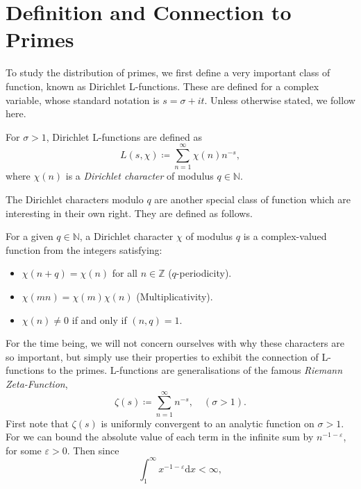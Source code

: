 \section{Definition and Connection to Primes}
To study the distribution of primes, we first define a very important class of function, known as Dirichlet L-functions. These are defined for a complex variable, whose standard notation is $s = \sigma + i t$. Unless otherwise stated, we follow \cite{ireland_rosen_1990} here.
\begin{definition}
\label{LFunctionDefinition}
For $\sigma > 1$, Dirichlet L-functions are defined as
\begin{equation}
    L(s, \chi) \coloneqq \sum_{n=1}^{\infty} \chi(n) n^{-s}, \nonumber
\end{equation}
where $\chi(n)$ is a \textit{Dirichlet character} of modulus $q \in \mathbb{N}$.
\end{definition}
The Dirichlet characters modulo $q$ are another special class of function which are interesting in their own right. They are defined as follows.
\begin{definition}
\label{DirichletCharacterDefinition}
For a given $q \in \mathbb{N}$, a Dirichlet character $\chi$ of modulus $q$ is a complex-valued function from the integers satisfying:
\begin{itemize}
    \item $\chi(n + q) = \chi(n)$ for all $n \in \mathbb{Z}$ ($q$-periodicity).
    \item $\chi(m n) = \chi(m) \chi(n)$ (Multiplicativity).
    \item $\chi(n) \neq 0$ if and only if $(n, q) = 1$.
\end{itemize}
\end{definition}
For the time being, we will not concern ourselves with why these characters are so important, but simply use their properties to exhibit the connection of L-functions to the primes. L-functions are generalisations of the famous \textit{Riemann Zeta-Function},
\begin{equation}
    \zeta(s) \coloneqq \sum_{n=1}^{\infty} n^{-s}, \quad (\sigma > 1).
\end{equation}
First note that $\zeta(s)$ is uniformly convergent to an analytic function on $\sigma > 1$. For we can bound the absolute value of each term in the infinite sum by $n^{-1 - \varepsilon}$, for some $\varepsilon > 0$. Then since
\begin{equation}
    \int_{1}^{\infty} x^{-1 - \varepsilon} \mathrm{d}x < \infty, \nonumber 
\end{equation}
